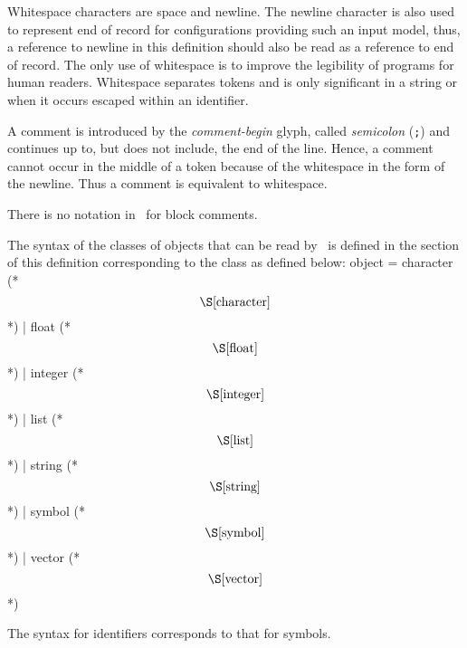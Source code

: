 %
\begin{optDefinition}
Whitespace characters are space and
newline.  The newline character is also used to represent end of record for
configurations providing such an input model, thus, a reference to newline in
this definition should also be read as a reference to end of record.  The only
use of whitespace is to improve the legibility of programs for human readers.
Whitespace separates tokens and is only significant in a string or when it
occurs escaped within an identifier.

A comment is introduced by the {\em
    comment-begin} glyph,
called {\em semicolon} (\verb+;+) and continues up to, but does not include, the
end of the line.  Hence, a comment cannot occur in the middle of a token because
of the whitespace in the form of the newline.  Thus a comment is equivalent to
whitespace.
%
\begin{note}
    There is no notation in \eulisp\ for block comments.
\end{note}
\end{optDefinition}
%
\begin{optDefinition}
The syntax of the classes of objects that can be read by \eulisp\ is defined in
the section of this definition corresponding to the class as defined below:
%
\Syntax
\label{object-syntax}
\savesyntax\objectSyntax\vbox{
\syntax
object
    = character (* \[\S\ref{character}\] *)
    | float (* \[\S\ref{float}\] *)
    | integer (* \[\S\ref{integer}\] *)
    | list (* \[\S\ref{list}\] *)
    | string (* \[\S\ref{string}\] *)
    | symbol (* \[\S\ref{symbol}\] *)
    | vector (* \[\S\ref{vector}\] *)
\endsyntax}

The syntax for identifiers 
 corresponds to that for symbols.
%
\end{optDefinition}
